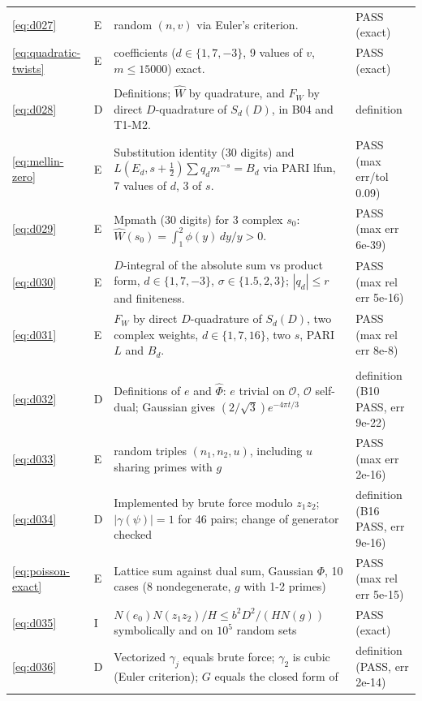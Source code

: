 \documentclass[11pt]{article}
\numberwithin{equation}{section}
\begin{document}
\begin{longtable}{@{}>{\raggedright\arraybackslash}p{1.2cm}>{\centering\arraybackslash}p{0.7cm}>{\raggedright\arraybackslash}p{9.05cm}>{\raggedright\arraybackslash}p{4.3cm}@{}}
\eqref{eq:d027} & E & 2000 random $(n,v)$ via Euler's criterion. & PASS (exact)\\
\eqref{eq:quadratic-twists} & E & 135000 coefficients ($d\in\{1,7,-3\}$, 9 values of $v$, $m\le15000$) exact. & PASS (exact)\\
\multicolumn{4}{@{}l}{\emph{Section~6}}\\
\eqref{eq:d028} & D & Definitions; $\widehat W$ by quadrature, and $F_W$ by direct $D$-quadrature of $S_d(D)$, in B04 and T1-M2. & definition\\
\eqref{eq:mellin-zero} & E & Substitution identity (30 digits) and $L(E_d,s+\frac12)\sum q_dm^{-s}=B_d$ via PARI lfun, 7 values of $d$, 3 of $s$. & PASS (max err/tol 0.09)\\
\eqref{eq:d029} & E & Mpmath (30 digits) for 3 complex $s_0$: $\widehat W(s_0)=\int_1^2\phi(y)\,dy/y>0$. & PASS (max err 6e-39)\\
\eqref{eq:d030} & E & $D$-integral of the absolute sum vs product form, $d\in\{1,7,-3\}$, $\sigma\in\{1.5,2,3\}$; $|q_d|\le r$ and finiteness. & PASS (max rel err 5e-16)\\
\eqref{eq:d031} & E & $F_W$ by direct $D$-quadrature of $S_d(D)$, two complex weights, $d\in\{1,7,16\}$, two $s$, PARI $L$ and $B_d$. & PASS (max rel err 8e-8)\\
\multicolumn{4}{@{}l}{\emph{Section~7}}\\
\eqref{eq:d032} & D & Definitions of $e$ and $\widehat\Phi$: $e$ trivial on $\mathcal O$, $\mathcal O$ self-dual; Gaussian gives $(2/\sqrt3)e^{-4\pi t/3}$ & definition (B10 PASS, err 9e-22)\\
\eqref{eq:d033} & E & 1200 random triples $(n_1,n_2,u)$, including $u$ sharing primes with $g$ & PASS (max err 2e-16)\\
\eqref{eq:d034} & D & Implemented by brute force modulo $z_1z_2$; $|\gamma(\psi)|=1$ for 46 pairs; change of generator checked & definition (B16 PASS, err 9e-16)\\
\eqref{eq:poisson-exact} & E & Lattice sum against dual sum, Gaussian $\Phi$, 10 cases (8 nondegenerate, $g$ with 1-2 primes) & PASS (max rel err 5e-15)\\
\eqref{eq:d035} & I & $N(e_0)N(z_1z_2)/H\le b^2D^2/(HN(g))$ symbolically and on $10^5$ random sets & PASS (exact)\\
\eqref{eq:d036} & D & Vectorized $\gamma_j$ equals brute force; $\gamma_2$ is cubic (Euler criterion); $G$ equals the closed form of~\cite{OAI1112} & definition (PASS, err 2e-14)\\

\end{longtable}
\end{document}
